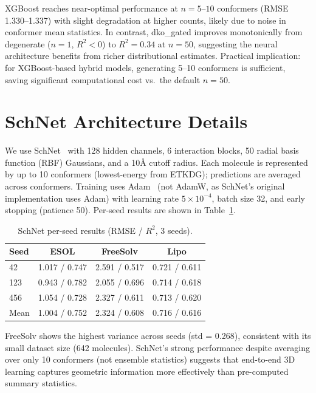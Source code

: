 \documentclass[sigconf]{acmart}
\begin{document}
XGBoost reaches near-optimal performance at $n{=}5$--$10$ conformers (RMSE 1.330--1.337) with slight degradation at higher counts, likely due to noise in conformer mean statistics. In contrast, dko\_gated improves monotonically from degenerate ($n{=}1$, $R^2 < 0$) to $R^2 = 0.34$ at $n{=}50$, suggesting the neural architecture benefits from richer distributional estimates. Practical implication: for XGBoost-based hybrid models, generating 5--10 conformers is sufficient, saving significant computational cost vs.\ the default $n{=}50$.

\section{SchNet Architecture Details}
\label{app:schnet}

We use SchNet~\cite{schutt2017schnet} with 128 hidden channels, 6 interaction blocks, 50 radial basis function (RBF) Gaussians, and a 10\AA{} cutoff radius. Each molecule is represented by up to 10 conformers (lowest-energy from ETKDG); predictions are averaged across conformers. Training uses Adam~\cite{kingma2015adam} (not AdamW, as SchNet's original implementation uses Adam) with learning rate $5 \times 10^{-4}$, batch size 32, and early stopping (patience 50). Per-seed results are shown in Table~\ref{tab:schnet_seeds}.

\begin{table}[ht]
\caption{SchNet per-seed results (RMSE / $R^2$, 3 seeds).}
\label{tab:schnet_seeds}
\centering
\small
\begin{tabular}{@{}lccc@{}}
\toprule
Seed & ESOL & FreeSolv & Lipo \\
\midrule
42  & 1.017 / 0.747 & 2.591 / 0.517 & 0.721 / 0.611 \\
123 & 0.943 / 0.782 & 2.055 / 0.696 & 0.714 / 0.618 \\
456 & 1.054 / 0.728 & 2.327 / 0.611 & 0.713 / 0.620 \\
\midrule
Mean & 1.004 / 0.752 & 2.324 / 0.608 & 0.716 / 0.616 \\
\bottomrule
\end{tabular}
\end{table}

FreeSolv shows the highest variance across seeds (std = 0.268), consistent with its small dataset size (642 molecules). SchNet's strong performance despite averaging over only 10 conformers (not ensemble statistics) suggests that end-to-end 3D learning captures geometric information more effectively than pre-computed summary statistics.
\end{document}

